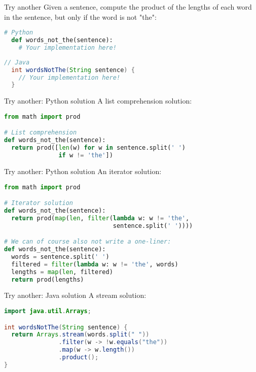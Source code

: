 \documentclass[../index.tex]{subfiles}
\begin{document}
\renewcommand{\currenttitle}{Try another}
\begin{frame}[fragile]{\currenttitle}
  Given a sentence, compute the product of the lengths of each word in the
  sentence, but only if the word is not "the":

  \begin{lstlisting}[language=Python]
  # Python
  def words_not_the(sentence):
    # Your implementation here!
  \end{lstlisting}

  \begin{lstlisting}[language=Java]
  // Java
  int wordsNotThe(String sentence) {
    // Your implementation here!
  }
  \end{lstlisting}
\end{frame}

\renewcommand{\currenttitle}{Try another: Python solution}
\begin{frame}[fragile]{\currenttitle}
  A list comprehension solution:

  \begin{lstlisting}[language=Python]
from math import prod

# List comprehension
def words_not_the(sentence):
  return prod([len(w) for w in sentence.split(' ')
               if w != 'the'])
  \end{lstlisting}
\end{frame}

\begin{frame}[fragile]{\currenttitle}
  An iterator solution:

  \begin{lstlisting}[language=Python]
from math import prod

# Iterator solution
def words_not_the(sentence):
  return prod(map(len, filter(lambda w: w != 'the',
                              sentence.split(' '))))

# We can of course also not write a one-liner:
def words_not_the(sentence):
  words = sentence.split(' ')
  filtered = filter(lambda w: w != 'the', words)
  lengths = map(len, filtered)
  return prod(lengths)
  \end{lstlisting}
\end{frame}

\renewcommand{\currenttitle}{Try another: Java solution}
\begin{frame}[fragile]{\currenttitle}
  A stream solution:

  \begin{lstlisting}[language=Java]
import java.util.Arrays;

int wordsNotThe(String sentence) {
  return Arrays.stream(words.split(" "))
               .filter(w -> !w.equals("the"))
               .map(w -> w.length())
               .product();
}
  \end{lstlisting}
\end{frame}
\end{document}
